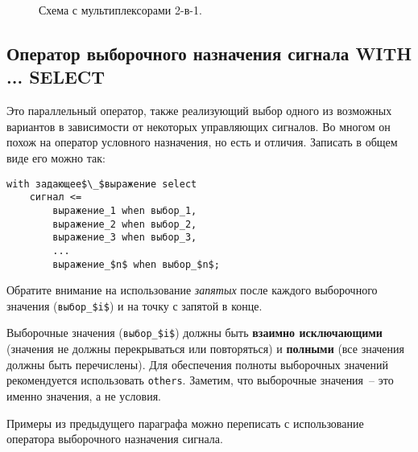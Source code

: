 \begin{figure}[ht]
\caption{Схема с мультиплексорами 2-в-1.}
\label{mux_fig_1}
\end{figure}

\subsection{Оператор выборочного назначения сигнала WITH ... SELECT}

Это параллельный оператор, также реализующий выбор одного из возможных вариантов в зависимости от некоторых управляющих сигналов. Во многом он похож на оператор условного назначения, но есть и отличия. Записать в общем виде его можно так:

\begin{Code}
\begin{lstlisting}[mathescape]
with задающее$\_$выражение select
    сигнал <=
        выражение_1 when выбор_1,
        выражение_2 when выбор_2,
        выражение_3 when выбор_3,
        ...
        выражение_$n$ when выбор_$n$;
\end{lstlisting}
\end{Code}

Обратите внимание на использование \emph{запятых} после каждого выборочного значения (\lstinline[mathescape]?выбор_$i$?) и на точку с запятой в конце.

Выборочные значения (\lstinline[mathescape]?выбор_$i$?) должны быть \textbf{взаимно исключающими} (значения не должны перекрываться или повторяться) и \textbf{полными} (все значения должны быть перечислены). Для обеспечения полноты выборочных значений рекомендуется использовать \lstinline?others?. Заметим, что выборочные значения~-- это именно значения, а не условия.

Примеры из предыдущего параграфа можно переписать с использование оператора выборочного назначения сигнала.

